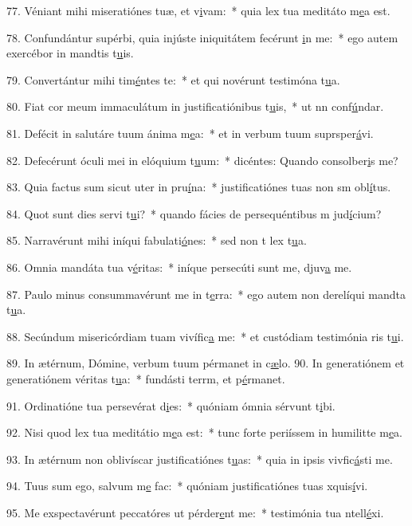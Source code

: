 77. Véniant mihi miseratiónes tuæ, et v\uline{i}vam:~* quia lex tua meditáto m\uline{e}a est.\par 
78. Confundántur supérbi, quia injúste iniquitátem fecérunt \uline{i}n me:~* ego autem exercébor in mandtis t\uline{u}is.\par 
79. Convertántur mihi tim\uline{é}ntes te:~* et qui novérunt testimóna t\uline{u}a.\par 
80. Fiat cor meum immaculátum in justificatiónibus t\uline{u}is,~* ut nn conf\uline{ú}ndar.\par 
81. Defécit in salutáre tuum ánima m\uline{e}a:~* et in verbum tuum suprsper\uline{á}vi.\par 
82. Defecérunt óculi mei in elóquium t\uline{u}um:~* dicéntes: Quando consolber\uline{i}s me?\par 
83. Quia factus sum sicut uter in pru\uline{í}na:~* justificatiónes tuas non sm obl\uline{í}tus.\par 
84. Quot sunt dies servi t\uline{u}i?~* quando fácies de persequéntibus m jud\uline{í}cium?\par 
85. Narravérunt mihi iníqui fabulati\uline{ó}nes:~* sed non t lex t\uline{u}a.\par 
86. Omnia mandáta tua v\uline{é}ritas:~* iníque persecúti sunt me, djuv\uline{a} me.\par 
87. Paulo minus consummavérunt me in t\uline{e}rra:~* ego autem non derelíqui mandta t\uline{u}a.\par 
88. Secúndum misericórdiam tuam vivífic\uline{a} me:~* et custódiam testimónia ris t\uline{u}i.\par 
89. In ætérnum, Dómine, verbum tuum pérmanet in c\uline{æ}lo.
90. In generatiónem et generatiónem véritas t\uline{u}a:~* fundásti terrm, et p\uline{é}rmanet.\par 
91. Ordinatióne tua persevérat d\uline{i}es:~* quóniam ómnia sérvunt t\uline{i}bi.\par 
92. Nisi quod lex tua meditátio m\uline{e}a est:~* tunc forte periíssem in humilitte m\uline{e}a.\par 
93. In ætérnum non oblivíscar justificatiónes t\uline{u}as:~* quia in ipsis vivfic\uline{á}sti me.\par 
94. Tuus sum ego, salvum m\uline{e} fac:~* quóniam justificatiónes tuas xquis\uline{í}vi.\par 
95. Me exspectavérunt peccatóres ut pérder\uline{e}nt me:~* testimónia tua ntell\uline{é}xi.\par 
